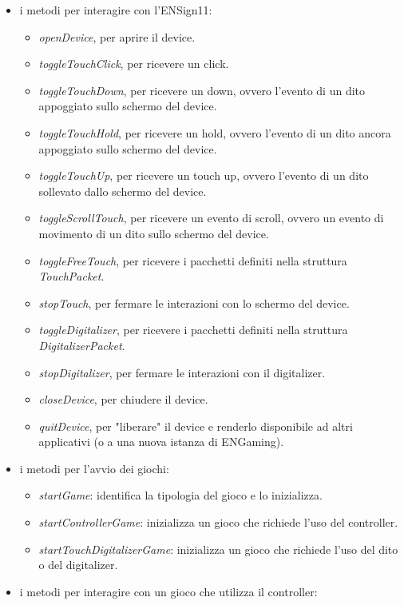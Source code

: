 \begin{itemize}
    \item i metodi per interagire con l'ENSign11: \begin{itemize}
        \item \emph{openDevice}, per aprire il device.
        \item \emph{toggleTouchClick}, per ricevere un click.
        \item \emph{toggleTouchDown}, per ricevere un down, ovvero l'evento di un dito appoggiato sullo schermo del device.
        \item \emph{toggleTouchHold}, per ricevere un hold, ovvero l'evento di un dito ancora appoggiato sullo schermo del device.
        \item \emph{toggleTouchUp}, per ricevere un touch up, ovvero l'evento di un dito sollevato dallo schermo del device.
        \item \emph{toggleScrollTouch}, per ricevere un evento di scroll, ovvero un evento di movimento di un dito sullo schermo del device.
        \item \emph{toggleFreeTouch}, per ricevere i pacchetti definiti nella struttura \emph{TouchPacket}.
        \item \emph{stopTouch}, per fermare le interazioni con lo schermo del device.
        \item \emph{toggleDigitalizer}, per ricevere i pacchetti definiti nella struttura \emph{DigitalizerPacket}.
        \item \emph{stopDigitalizer}, per fermare le interazioni con il digitalizer.
        \item \emph{closeDevice}, per chiudere il device.
        \item \emph{quitDevice}, per "liberare" il device e renderlo disponibile ad altri applicativi (o a una nuova istanza di ENGaming).
    \end{itemize}
    \item i metodi per l'avvio dei giochi: \begin{itemize}
        \item \emph{startGame}: identifica la tipologia del gioco e lo inizializza.
        \item \emph{startControllerGame}: inizializza un gioco che richiede l'uso del controller.
        \item \emph{startTouchDigitalizerGame}: inizializza un gioco che richiede l'uso del dito o del digitalizer.
    \end{itemize}
    \item i metodi per interagire con un gioco che utilizza il controller: \begin{itemize}

\end{itemize}
\end{itemize}
